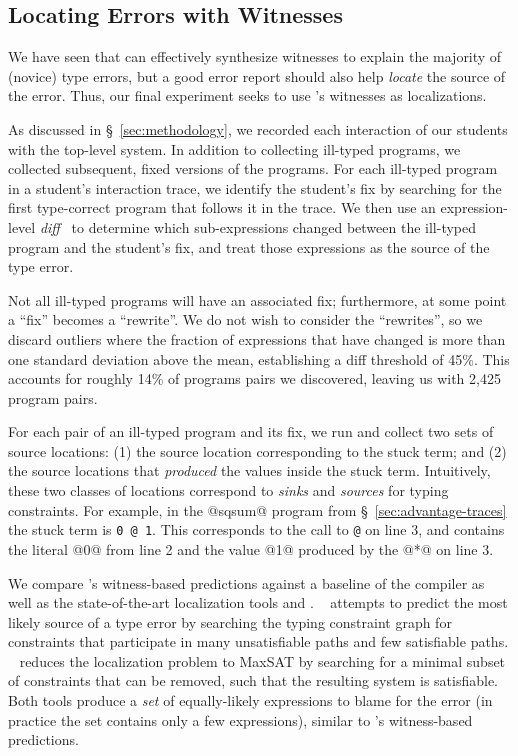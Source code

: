 
\subsection{Locating Errors with Witnesses}
\label{sec:locating}

We have seen that \toolname can effectively synthesize witnesses to
explain the majority of (novice) type errors, but a good error report
should also help \emph{locate} the source of the error.
%
Thus, our final experiment seeks to use \toolname's witnesses as
localizations.


As discussed in \S~\ref{sec:methodology}, we recorded
each interaction of our students with the \ocaml top-level system.
%
In addition to collecting ill-typed programs, we collected
subsequent, fixed versions of the programs.
%
For each ill-typed program in a student's interaction trace, we identify
the student's fix by searching for the first type-correct program
that follows it in the trace.
%
We then use an expression-level \emph{diff}~\cite{Lempsink2009-xf} to
determine which sub-expressions changed between the ill-typed program
and the student's fix, and treat those expressions as the source of the
type error.

Not all ill-typed programs will have an associated fix; furthermore,
at some point a ``fix'' becomes a ``rewrite''.
%
We do not wish to consider the ``rewrites'', so we discard outliers
where the fraction of expressions that have changed is more than one
standard deviation above the mean, establishing a diff threshold of
45\%.
%
This accounts for roughly 14\% of programs pairs we discovered, leaving
us with 2,425 program pairs.

For each pair of an ill-typed program and its fix, we run \toolname and
collect two sets of source locations:
%
(1) the source location corresponding to the stuck term; and
%
(2) the source locations that \emph{produced} the values inside the
stuck term.
%
Intuitively, these two classes of locations correspond to \emph{sinks}
and \emph{sources} for typing constraints.
%
For example, in the @sqsum@ program from \S~\ref{sec:advantage-traces}
the stuck term is \verb!0 @ 1!.
%
This corresponds to the call to \verb!@! on line 3, and contains
the literal @0@ from line 2 and the value @1@ produced by the
@*@ on line 3.

We compare \toolname's witness-based predictions against a baseline of
the \ocaml compiler as well as the state-of-the-art %
localization tools \sherrloc and \mycroft.
%
\sherrloc~\cite{Zhang2014-lv} attempts to predict the most likely source
of a type error by searching the typing constraint graph for constraints
that participate in many unsatisfiable paths and few satisfiable paths.
%
\mycroft~\cite{Loncaric2016-uk} reduces the localization problem to
MaxSAT by searching for a minimal subset of constraints that can be
removed, such that the resulting system is satisfiable.
%
Both tools produce a \emph{set} of equally-likely expressions to blame
for the error (in practice the set contains only a few expressions),
similar to \toolname's witness-based predictions.

